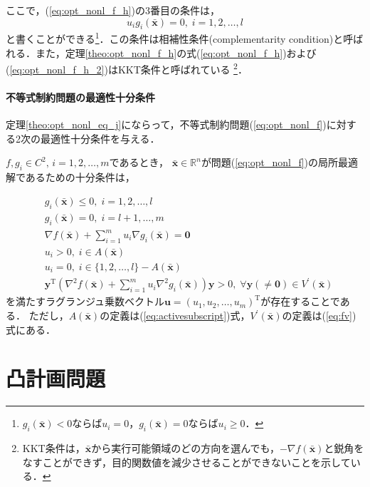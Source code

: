 \documentclass{jsreport}
\begin{document}
ここで，(\ref{eq:opt_nonl_f_h})の3番目の条件は，
\begin{equation}\label{eq:comp}
  u_i g_i(\bar{\bm{x}}) = 0, \; i = 1, 2, \ldots, l
\end{equation}
と書くことができる\footnote{$g_i(\bar{\bm{x}}) < 0$ならば$u_i = 0$，$g_i(\bar{\bm{x}}) = 0$ならば$u_i \geq 0$．}．この条件は相補性条件(complementarity condition)と呼ばれる．また，定理\ref{theo:opt_nonl_f_h}の式(\ref{eq:opt_nonl_f_h})および(\ref{eq:opt_nonl_f_h_2})はKKT条件と呼ばれている
\footnote{KKT条件は，$\bar{\bm{x}}$から実行可能領域のどの方向を選んでも，$-\nabla f(\bar{\bm{x}})$と鋭角をなすことができず，目的関数値を減少させることができないことを示している．}．

\paragraph{不等式制約問題の最適性十分条件}
定理\ref{theo:opt_nonl_eq_j}にならって，不等式制約問題(\ref{eq:opt_nonl_f})に対する2次の最適性十分条件を与える．
\begin{theo}\label{theo:opt_nonl_f_j}
  $f, g_i \in C^2, \, i = 1, 2, \ldots, m$であるとき，
  $\bar{\bm{x}} \in \mathbb{R}^n$が問題(\ref{eq:opt_nonl_f})の局所最適解であるための十分条件は，

  \begin{align}
    &g_i(\bar{\bm{x}}) \leq 0, \; i = 1, 2, \ldots, l \nonumber \\
    &g_i(\bar{\bm{x}}) = 0, \; i = l + 1, \ldots, m \nonumber \\
    &\nabla f(\bar{\bm{x}}) + \sum_{i = 1}^m u_i \nabla g_i(\bar{\bm{x}}) = \bm{0} \nonumber \\
    &u_i > 0, \; i \in A(\bar{\bm{x}}) \nonumber \\
    &u_i = 0, \; i \in \{1, 2, \ldots, l\} - A(\bar{\bm{x}}) \nonumber \\
    &\bm{y}^{\mathrm{T}} \left({\nabla}^2 f(\bar{\bm{x}}) + \sum_{i = 1}^m u_i {\nabla}^2 g_i(\bar{\bm{x}})\right) \bm{y} > 0, \; \forall \bm{y}(\neq \bm{0}) \in V^{\prime}(\bar{\bm{x}})
  \end{align}
  を満たすラグランジュ乗数ベクトル$\bm{u} = (u_1, u_2, \ldots, u_m)^{\mathrm{T}}$が存在することである．
  ただし，$A(\bar{\bm{x}})$の定義は(\ref{eq:activesubscript})式，$V^{\prime}(\bar{\bm{x}})$の定義は(\ref{eq:fv})式にある．
\end{theo}



\section{凸計画問題}
\end{document}
